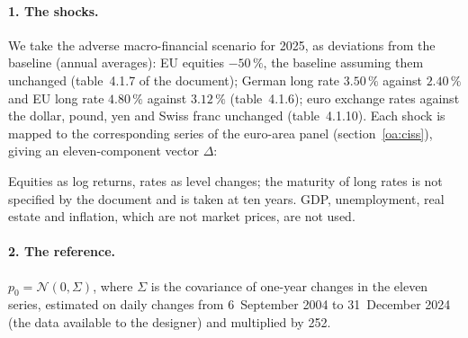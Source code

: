 \documentclass[11pt]{article}
\theoremstyle{definition}
\begin{document}
\paragraph{1. The shocks.} We take the adverse macro-financial scenario
\citep{eba2025} for 2025, as deviations from the baseline (annual averages):
EU equities $-50\,\%$, the baseline assuming them unchanged (table~4.1.7 of
the document); German long rate $3.50\,\%$ against $2.40\,\%$ and EU long
rate $4.80\,\%$ against $3.12\,\%$ (table~4.1.6); euro exchange rates against
the dollar, pound, yen and Swiss franc unchanged (table~4.1.10). Each shock is
mapped to the corresponding series of the euro-area panel
(section~\ref{oa:ciss}), giving an eleven-component vector $\Delta$:
\begin{center}
\small
{}
\end{center}
Equities as log returns, rates as level changes; the maturity of long rates is
not specified by the document and is taken at ten years. GDP, unemployment,
real estate and inflation, which are not market prices, are not used.

\paragraph{2. The reference.} $p_0=\mathcal N(0,\Sigma)$, where $\Sigma$ is
the covariance of one-year changes in the eleven series, estimated on daily
changes from 6~September 2004 to 31~December 2024 (the data available to the
designer) and multiplied by 252.
\end{document}
